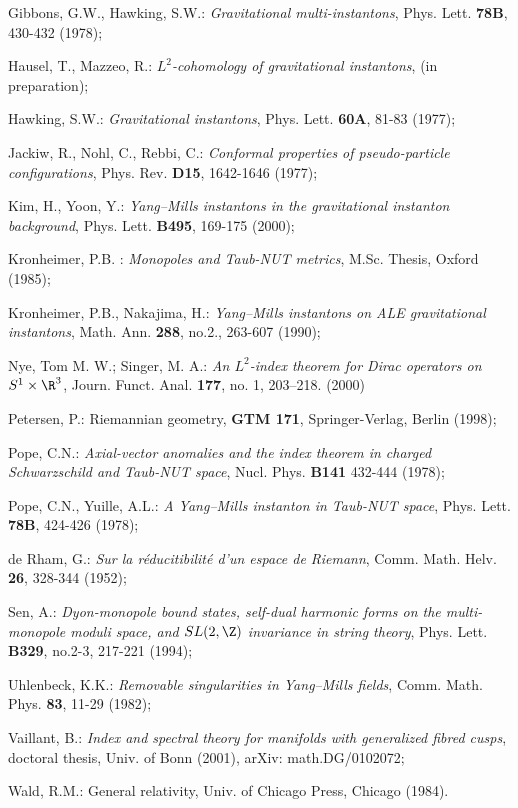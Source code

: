 \documentclass[a4paper,12pt,draft]{article}
\begin{document}
\begin{thebibliography}{99}
 Gibbons, G.W., Hawking, S.W.: {\it Gravitational
multi-instantons}, Phys. Lett. {\bf 78B}, 430-432 (1978);

 Hausel, T., Mazzeo, R.: {\it $L^2$-cohomology of
gravitational instantons}, (in preparation);

 Hawking, S.W.: {\it Gravitational instantons},
Phys. Lett. {\bf 60A}, 81-83 (1977);

 Jackiw, R., Nohl, C., Rebbi, C.: {\it Conformal
properties of pseudo-particle configurations}, Phys. Rev. {\bf D15},
1642-1646 (1977);

 Kim, H., Yoon, Y.: {\it Yang--Mills instantons in the 
gravitational instanton background}, Phys. Lett. {\bf B495}, 169-175
(2000); 

 Kronheimer, P.B. : {\it Monopoles and Taub-NUT metrics}, M.Sc. 
Thesis, Oxford (1985); 

 Kronheimer, P.B., Nakajima, H.: {\it Yang--Mills
instantons on ALE gravitational instantons}, Math. Ann. {\bf 288}, no.2., 
263-607 (1990);

 Nye, Tom M. W.; Singer, M. A.: {\it An $L^2$-index
theorem for Dirac operators on $S^1\times\R^3$},
Journ. Funct. Anal. {\bf 177}, no. 1, 203--218. (2000)

 Petersen, P.: Riemannian geometry, {\bf GTM 171},
Springer-Verlag, Berlin (1998);

 Pope, C.N.: {\it Axial-vector anomalies and the index
theorem in charged Schwarzschild and Taub-NUT space}, Nucl. Phys. {\bf
B141} 432-444 (1978);

 Pope, C.N., Yuille, A.L.: {\it A Yang--Mills instanton
in Taub-NUT space}, Phys. Lett. {\bf 78B}, 424-426 (1978);

 de Rham, G.: {\it Sur la r\'educitibilit\'e d'un espace de
Riemann}, Comm. Math. Helv. {\bf 26}, 328-344 (1952);

 Sen, A.: {\it Dyon-monopole bound states, self-dual
harmonic forms on the multi-monopole moduli space, and $SL(2,\Z)$
invariance in string theory}, Phys. Lett. {\bf B329},  no.2-3, 217-221
(1994);

 Uhlenbeck, K.K.: {\it Removable singularities in Yang--Mills
fields}, Comm. Math. Phys. {\bf 83}, 11-29 (1982);
 
 Vaillant, B.: {\it Index and spectral theory for manifolds
with generalized fibred cusps}, doctoral thesis, Univ. of Bonn (2001),
arXiv: math.DG/0102072;

 Wald, R.M.: General relativity, Univ. of Chicago Press,
Chicago (1984).

\end{thebibliography}
\end{document}
